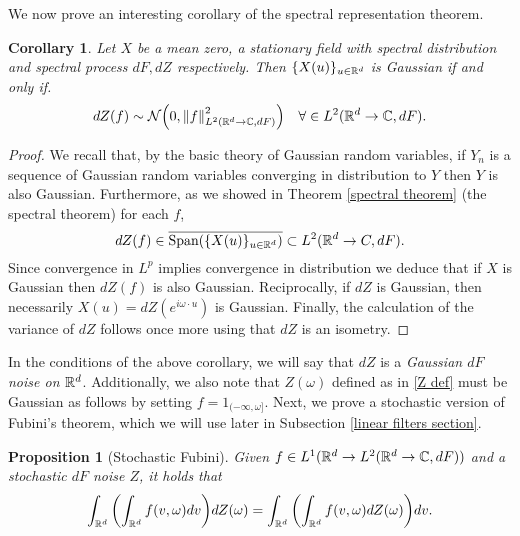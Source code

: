 \documentclass[12pt]{article}
\newtheorem{proposition}{Proposition}
\newtheorem{corollary}{Corollary}
\begin{document}
We now prove an interesting corollary of the spectral representation theorem.
\begin{corollary}\label{Gaussian integral}
	Let $X$ be a mean zero, a stationary field with  spectral distribution and spectral process $dF,dZ$ respectively. Then $\{X(u)\}_{u\in{\mathbb R}^d}$ is Gaussian if and only if.
	\begin{equation*}
		dZ(f)\sim\mathcal{N}\qty(0,\norm{f}^2_{L^2({\mathbb R}^d\to\mathbb{C},dF)})\quad\forall \in L^2({\mathbb R}^d\to\mathbb{C},dF).
	\end{equation*}
\end{corollary}
\begin{proof}
	We recall that, by the basic theory of Gaussian random variables, if $Y_n$ is a sequence of Gaussian random variables converging in distribution to $Y$ then $Y$ is also Gaussian. Furthermore, as we showed in Theorem \ref{spectral theorem} (the spectral theorem) for each $f$,
	$$dZ(f)\in\overline{\text{Span}(\{X(u)\}_{u\in{\mathbb R}^d})}\subset L^2({\mathbb R}^d\to C,dF).$$
	Since convergence in $L^p$ implies convergence in distribution we deduce that if $X$ is Gaussian then $dZ(f)$ is also Gaussian. Reciprocally, if $dZ$ is Gaussian, then necessarily $X(u)=dZ(e^{i\omega\cdot u})$ is Gaussian. Finally, the calculation of the variance of $dZ$ follows once more using that $dZ$ is an isometry.
\end{proof}
In the conditions of the above corollary, we will say that $dZ$ is a \emph{Gaussian $dF$ noise on ${\mathbb R}^d$}. Additionally, we also note that $Z(\omega)$ defined as in \eqref{Z def} must be Gaussian as follows by setting $f=1_{(-\infty,\omega]}$. Next, we prove a stochastic version of Fubini's theorem, which we will use later in Subsection \ref{linear filters section}.
\begin{proposition}[Stochastic Fubini]\label{stochastic Fbini}
	Given $f\in L^1({\mathbb R}^d\to L^2({\mathbb R}^d\to\mathbb{C},dF))$ and a stochastic $dF$ noise  $Z$, it holds that
	\begin{equation*}
		\int_{{\mathbb R}^d}\qty(\int_{{\mathbb R}^d}f(v,\omega)dv)dZ(\omega)=\int_{{\mathbb R}^d}\qty(\int_{{\mathbb R}^d}f(v,\omega)dZ(\omega))dv.
	\end{equation*}
\end{proposition}
\end{document}
